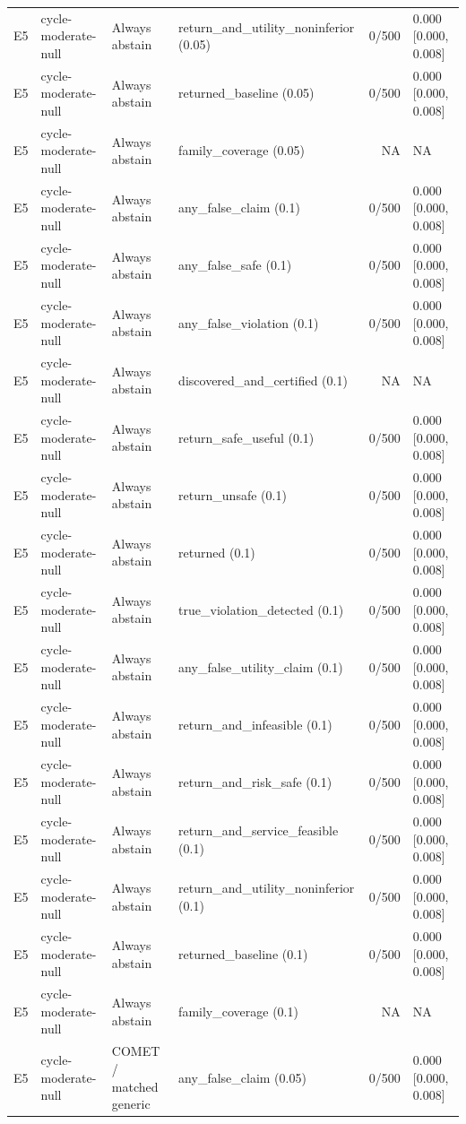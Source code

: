 \begin{longtable}{p{.04\linewidth}p{.18\linewidth}p{.19\linewidth}p{.16\linewidth}r p{.21\linewidth}}
E5 & cycle-moderate-null & Always abstain & return\_and\_utility\_noninferior (0.05) & 0/500 & 0.000 [0.000, 0.008]\\
E5 & cycle-moderate-null & Always abstain & returned\_baseline (0.05) & 0/500 & 0.000 [0.000, 0.008]\\
E5 & cycle-moderate-null & Always abstain & family\_coverage (0.05) & NA & NA\\
E5 & cycle-moderate-null & Always abstain & any\_false\_claim (0.1) & 0/500 & 0.000 [0.000, 0.008]\\
E5 & cycle-moderate-null & Always abstain & any\_false\_safe (0.1) & 0/500 & 0.000 [0.000, 0.008]\\
E5 & cycle-moderate-null & Always abstain & any\_false\_violation (0.1) & 0/500 & 0.000 [0.000, 0.008]\\
E5 & cycle-moderate-null & Always abstain & discovered\_and\_certified (0.1) & NA & NA\\
E5 & cycle-moderate-null & Always abstain & return\_safe\_useful (0.1) & 0/500 & 0.000 [0.000, 0.008]\\
E5 & cycle-moderate-null & Always abstain & return\_unsafe (0.1) & 0/500 & 0.000 [0.000, 0.008]\\
E5 & cycle-moderate-null & Always abstain & returned (0.1) & 0/500 & 0.000 [0.000, 0.008]\\
E5 & cycle-moderate-null & Always abstain & true\_violation\_detected (0.1) & 0/500 & 0.000 [0.000, 0.008]\\
E5 & cycle-moderate-null & Always abstain & any\_false\_utility\_claim (0.1) & 0/500 & 0.000 [0.000, 0.008]\\
E5 & cycle-moderate-null & Always abstain & return\_and\_infeasible (0.1) & 0/500 & 0.000 [0.000, 0.008]\\
E5 & cycle-moderate-null & Always abstain & return\_and\_risk\_safe (0.1) & 0/500 & 0.000 [0.000, 0.008]\\
E5 & cycle-moderate-null & Always abstain & return\_and\_service\_feasible (0.1) & 0/500 & 0.000 [0.000, 0.008]\\
E5 & cycle-moderate-null & Always abstain & return\_and\_utility\_noninferior (0.1) & 0/500 & 0.000 [0.000, 0.008]\\
E5 & cycle-moderate-null & Always abstain & returned\_baseline (0.1) & 0/500 & 0.000 [0.000, 0.008]\\
E5 & cycle-moderate-null & Always abstain & family\_coverage (0.1) & NA & NA\\
E5 & cycle-moderate-null & COMET / matched generic & any\_false\_claim (0.05) & 0/500 & 0.000 [0.000, 0.008]\\

\end{longtable}
